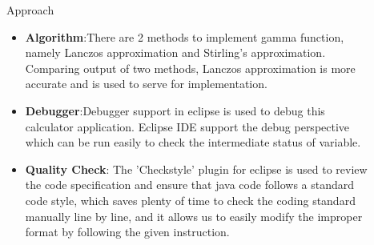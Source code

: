 \documentclass[final]{beamer}
\newlength{\sepwid}
\newlength{\onecolwid}
\newlength{\twocolwid}
\begin{document}
\begin{frame}[t]
\begin{columns}[t]
\begin{column}{\sepwid}\end{column} %

\begin{column}{\twocolwid} %

\begin{columns}[t,totalwidth=\twocolwid] %

\begin{column}{\onecolwid}\vspace{-.6in} %


\begin{block}{Approach}

\begin{itemize}
\setlength{\itemsep}{20pt}
\item \textbf{Algorithm}:There are 2 methods to implement gamma function, namely Lanczos approximation and Stirling's approximation. Comparing output of two methods, Lanczos approximation is more accurate and is used to serve for implementation.
\setlength{\itemsep}{20pt}
\item \textbf{Debugger}:Debugger support in eclipse is used to debug this calculator application. Eclipse IDE support the debug perspective which can be run easily to check the intermediate status of variable.
\setlength{\itemsep}{20pt}
\item \textbf{Quality Check}: The 'Checkstyle' plugin for eclipse is used to review the code specification and ensure that java code follows a standard code style, which saves plenty of time to check the coding standard manually line by line, and it allows us to easily modify the improper format by following the given instruction.

\end{itemize}

\end{block}


\end{column} %

\begin{column}{\onecolwid}\vspace{-.6in} %


\end{column}
\end{columns}
\end{column}
\end{columns}
\end{frame}
\end{document}
